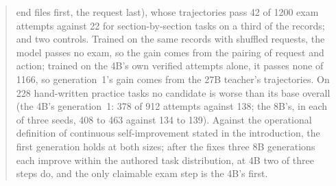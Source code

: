 \begin{abstract}
end files first, the request last), whose trajectories pass 42 of 1200 exam attempts against 22 for section-by-section tasks on
a third of the records; and two controls. Trained on the same records with shuffled requests, the model passes no exam, so the
gain comes from the pairing of request and action; trained on the 4B's own verified attempts alone, it passes none of 1166, so
generation~1's gain comes from the 27B teacher's trajectories. On 228 hand-written practice tasks no candidate is worse
than its base overall (the 4B's generation~1: 378 of 912 attempts against 138; the 8B's, in each of three seeds, 408 to 463 against 134 to 139). Against the operational definition of continuous
self-improvement stated in the introduction, the first generation holds at both sizes; after the fixes three 8B
generations each improve within the authored task distribution, at 4B two of three steps do, and the only claimable exam step is
the 4B's first.
\end{abstract}
